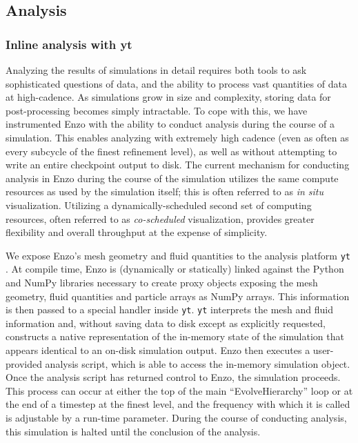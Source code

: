 \subsection{Analysis}
\label{sec.num.analysis}

\subsubsection{Inline analysis with yt}

Analyzing the results of simulations in detail requires both tools to ask
sophisticated questions of data, and the ability to process vast quantities of
data at high-cadence.  As simulations grow in size and complexity, storing data
for post-processing becomes simply intractable.  To cope with this, we have
instrumented Enzo with the ability to conduct analysis during the course of a
simulation.  This enables analyzing with extremely high cadence (even as often
as every subcycle of the finest refinement level), as well as without
attempting to write an entire checkpoint output to disk.  The current mechanism
for conducting analysis in Enzo during the course of the simulation utilizes
the same compute resources as used by the simulation itself; this is often
referred to as \textit{in situ} visualization.  Utilizing a
dynamically-scheduled second set of computing resources, often referred to as
\textit{co-scheduled} visualization, provides greater flexibility and overall
throughput at the expense of simplicity.

We expose Enzo's mesh geometry and fluid quantities to the analysis platform
\texttt{yt} \citep{2011ApJS..192....9T, 2011arXiv1112.4482T}.  At compile time,
Enzo is (dynamically or statically) linked against the Python and NumPy
libraries necessary to create proxy objects exposing the mesh geometry,
fluid quantities and particle arrays as NumPy arrays.  This information is then
passed to a special handler inside \texttt{yt}.  \texttt{yt} interprets the
mesh and fluid information and, without saving data to disk except as
explicitly requested, constructs a native representation of the in-memory state
of the simulation that appears identical to an on-disk simulation output.
Enzo then executes a user-provided analysis script, which is able to access the
in-memory simulation object.  Once the analysis script has returned control to
Enzo, the simulation proceeds.  This process can occur at either the top of the
main ``EvolveHierarchy'' loop or at the end of a timestep at the finest level,
and the frequency with which it is called is adjustable by a run-time
parameter.  During the course of conducting analysis, this simulation is halted
until the conclusion of the analysis.

